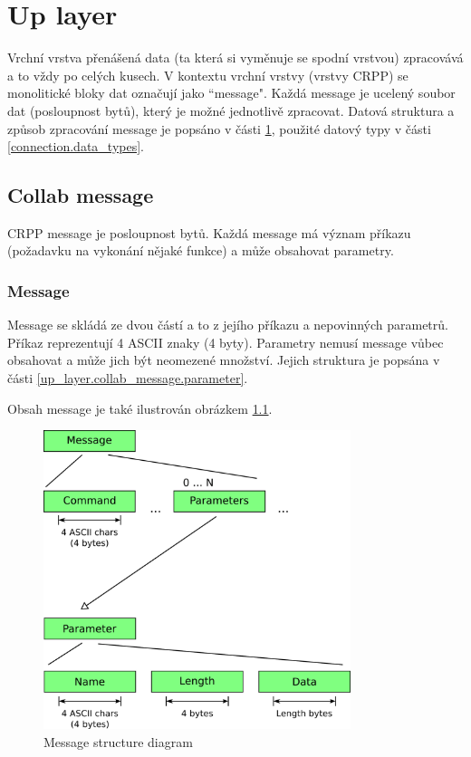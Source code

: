 \part{Up layer}
\label{up_layer}

Vrchní vrstva přenášená data (ta která si vyměnuje se spodní vrstvou) zpracovává a to vždy po celých kusech. V kontextu vrchní vrstvy (vrstvy CRPP) se monolitické bloky dat označují jako ``message". Každá message je ucelený soubor dat (posloupnost bytů), který je možné jednotlivě zpracovat. Datová struktura a způsob zpracování message je popsáno v části \ref{up_layer.collab_message}, použité datový typy v části \ref{connection.data_types}.

\chapter{Collab message}
\label{up_layer.collab_message}

CRPP message je posloupnost bytů. Každá message má význam příkazu (požadavku na vykonání nějaké funkce) a může obsahovat parametry.

\section{Message}

Message se skládá ze dvou částí a to z jejího příkazu a nepovinných parametrů. Příkaz reprezentují 4 ASCII znaky (4 byty). Parametry nemusí message vůbec obsahovat a může jich být neomezené množství. Jejich struktura je popsána v části \ref{up_layer.collab_message.parameter}.

Obsah message je také ilustrován obrázkem \ref{up_layer.pictures.message_structure}.

\begin{figure}[h]
  \centering
  \includegraphics[width=0.80\textwidth]{diagrams/message_structure_diagram.png}
  \caption{Message structure diagram}
  \label{up_layer.pictures.message_structure}
\end{figure}

